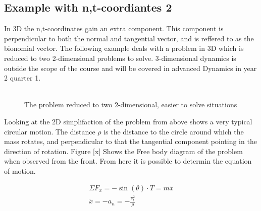\documentclass[11pt, a4paper]{article}
\begin{document}
\subsection{Example with n,t-coordiantes 2}
In 3D the n,t-coordinates gain an extra component. This component is perpendicular to both the 
normal and tangential vector, and is reffered to as the bionomial vector. The following example
deals with a problem in 3D which is reduced to two 2-dimensional problems to solve. 3-dimensional
dynamics is outside the scope of the course and will be covered in advanced Dynamics in year 2 quarter 1.\\
\\
\begin{figure}[h]
    \centering
    \qquad
    \caption{The problem reduced to two 2-dimensional, easier to solve situations}
\end{figure}

Looking at the 2D simplifaction of the problem from above shows a very typical circular motion.
The distance $\rho$ is the distance to the circle around which the mass rotates, and perpendicular 
to that the tangential component pointing in the direction of rotation. Figure [x] Shows the Free body diagram of the problem when
observed from the front. From here it is possible to determin the equation of motion.

\begin{gather}
    \Sigma F_x = -\sin(\theta)\cdot T = m\ddot{x}\\
    \ddot{x} = -a_n = -\frac{v_t^2}{\rho}
\end{gather}
\end{document}
